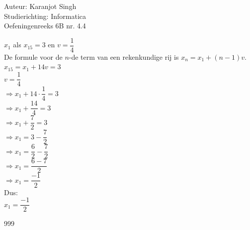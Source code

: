 \documentclass[a4paper]{article}
\begin{document}
\noindent \large Auteur: Karanjot Singh\\
\noindent \large Studierichting: Informatica\\
\noindent \large Oefeningenreeks 6B nr. 4.4\\

\normalsize

$x_1$ als $x_{15} = 3$ en $v = \dfrac{1}{4}$\\

De formule voor de $n$-de term van een rekenkundige rij is $x_n = x_1 + (n - 1)v$.\\

$x_{15} = x_1 + 14v = 3$\\

$v = \dfrac{1}{4}$\\

$\Rightarrow x_1 + 14 \cdot \dfrac{1}{4} = 3$\\

$\Rightarrow x_1 + \dfrac{14}{4} = 3$\\

$\Rightarrow x_1 + \dfrac{7}{2} = 3$\\

$\Rightarrow x_1 = 3 - \dfrac{7}{2}$\\

$\Rightarrow x_1 = \dfrac{6}{2} - \dfrac{7}{2}$\\

$\Rightarrow x_1 = \dfrac{6 - 7}{2}$\\

$\Rightarrow x_1 = \dfrac{-1}{2}$\\

Dus:\\

$x_1 = \dfrac{-1}{2}$\\

\begin{thebibliography}{999}
\end{thebibliography}
\end{document}

